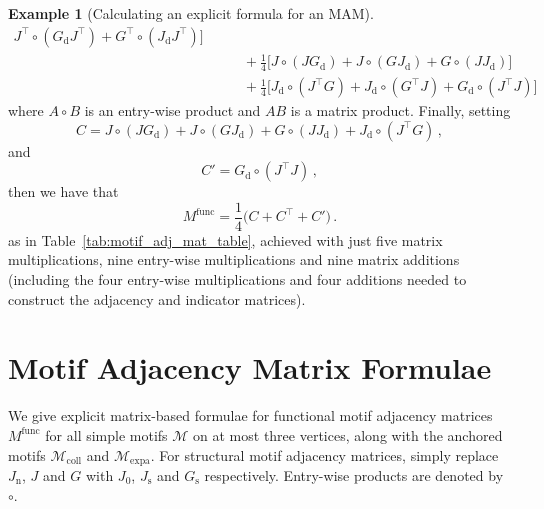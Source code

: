 \documentclass[12pt,draft]{ociamthesis}
\theoremstyle{plain}
\theoremstyle{definition}
\newtheorem{example}{Example}[chapter]
\theoremstyle{remark}
\newcommand\ca[1]{\mathcal{#1}}
\begin{document}
\begin{example}[Calculating an explicit formula for an MAM]
\begin{align*}
J^\top \circ (G_\mathrm{d} J^\top) + G^\top \circ (J_\mathrm{d} J^\top)
\Big] \\
& \qquad + \frac{1}{4} \Big[ J \circ (J G_\mathrm{d}) + J \circ (G
J_\mathrm{d}) + G \circ (J J_\mathrm{d}) \Big] \\
& \qquad + \frac{1}{4} \Big[ J_\mathrm{d} \circ (J^\top G) + J_\mathrm{d}
\circ (G^\top J) + G_\mathrm{d} \circ (J^\top J) \Big]
\end{align*}
%
where $A \circ B$ is an entry-wise product and $AB$ is a matrix product.
Finally, setting
$$C = J \circ (J G_\mathrm{d}) + J \circ (G J_\mathrm{d}) + G \circ (J
J_\mathrm{d}) + J_\mathrm{d} \circ (J^\top G)\,, $$
and
$$ C' = G_\mathrm{d} \circ (J^\top J)\,, $$
then we have that
$$ M^\mathrm{func} = \frac{1}{4} \big(C + C^\top + C' \big)\,. $$
as in Table~\ref{tab:motif_adj_mat_table}, achieved with just five matrix
multiplications, nine entry-wise multiplications and nine matrix additions
(including the four entry-wise multiplications and four additions needed to
construct the adjacency and indicator matrices).
\end{example}
\clearpage{}
\clearpage{}
\chapter{Motif Adjacency Matrix Formulae}
\label{chap:appendix_matrices}

We give explicit matrix-based formulae for functional motif adjacency matrices
$M^\mathrm{func}$ for all simple motifs $\ca{M}$ on at most three vertices,
along with the anchored motifs $\ca{M}_\mathrm{coll}$ and
$\ca{M}_\mathrm{expa}$. For structural motif adjacency matrices, simply replace
$J_\mathrm{n}$, $J$ and $G$ with $J_0$, $J_\mathrm{s}$ and $G_\mathrm{s}$
respectively. Entry-wise products are denoted by $\circ$.
\end{document}

